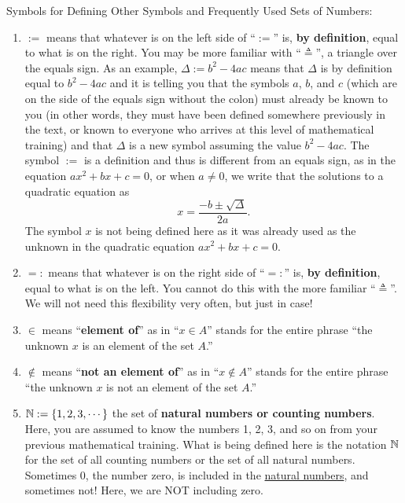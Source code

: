 \begin{tcolorbox}[colback = mylightblue, title=\textbf{Given the above as motivation, we define a set of symbols that we will frequently use in the course:}, breakable]

\noindent \begin{definition} 
\label{def:SymbolsAndSets}
Symbols for Defining Other Symbols and Frequently Used Sets of Numbers:
\begin{enumerate}
\renewcommand{\labelenumi}{(\alph{enumi})}
\setlength{\itemsep}{.2cm}

        \item  $:=$ means that whatever is on the left side of ``$:=$'' is, \textbf{by definition}, equal to what is on the right. You may be more familiar with ``$\triangleq$'', a triangle over the equals sign. As an example, $\Delta:= {b^2 - 4 ac}$ means that $\Delta$ is by definition equal to ${b^2 - 4 ac}$ and it is telling you that the symbols $a$, $b$, and $c$ (which are on the side of the equals sign without the colon) must already be known to you (in other words, they must have been defined somewhere previously in the text, or known to everyone who arrives at this level of mathematical training) and that $\Delta$ is a new symbol assuming the value ${b^2 - 4 ac}$. The symbol $:=$ is a definition and thus is different from an equals sign, as in the equation $a x^2 + bx + c = 0$, or when $a \neq 0$, we write that the solutions to a quadratic equation as 
        $$x =  \frac{ -b \pm \sqrt{\Delta} }{2a}.$$ 
        The symbol $x$ is not being defined here as it was already used as the unknown in the quadratic equation $a x^2 + bx + c = 0$.

         \item  $=:$ means that whatever is on the right side of ``$=:$'' is, \textbf{by definition}, equal to what is on the left. You cannot do this with the more familiar ``$\triangleq$''. We will not need this flexibility very often, but just in case!


        \item  $\in$ means ``\textbf{element of}'' as in ``$x\in A$'' stands for the entire phrase ``the unknown $x$ is an element of the set $A$.''

        \item $\not \in$ means ``\textbf{not an element of}'' as in ``$x \not \in A$'' stands for the entire phrase ``the unknown $x$ is not an element of the set $A$.''
        
        \item  $\mathbb N:= \{1,2,3,\dotsb\}$ the set of \textbf{natural numbers or counting numbers}. Here, you are assumed to know the numbers 1, 2, 3, and so on from your previous mathematical training. What is being defined here is the notation $\mathbb N$ for the set of all counting numbers or the set of all natural numbers. Sometimes $0$, the number zero, is included in the \href{https://en.wikipedia.org/wiki/Natural_number}{natural numbers}, and sometimes not! Here, we are NOT including zero. 
        

\end{enumerate}
\end{definition}
\end{tcolorbox}

